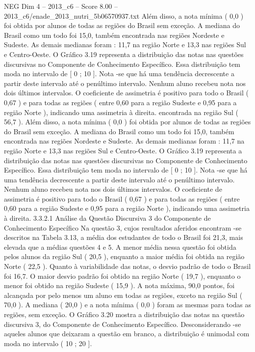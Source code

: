 \begin{textsample}{NEG Dim 4 – 2013\_c6 – Score 8.00 – 2013\_c6/enade\_2013\_nutri\_5b06570937.txt}
Além disso, a nota mínima ( 0,0 ) foi obtida por alunos de todas as regiões do Brasil sem exceção.
A mediana do Brasil como um todo foi 15,0, também encontrada nas regiões Nordeste e Sudeste.
As demais medianas foram : 11,7 na região Norte e 13,3 nas regiões Sul e Centro-Oeste.
O Gráfico 3.19 representa a distribuição das notas nas questões discursivas no Componente de Conhecimento Específico.
Essa distribuição tem moda no intervalo de [ 0 ; 10 ].
Nota -se que há uma tendência decrescente a partir deste intervalo até o penúltimo intervalo.
Nenhum aluno recebeu nota nos dois últimos intervalos.
O coeficiente de assimetria é positivo para todo o Brasil ( 0,67 ) e para todas as regiões ( entre 0,60 para a região Sudeste e 0,95 para a região Norte ), indicando uma assimetria à direita. encontrada na região Sul ( 56,7 ).
Além disso, a nota mínima ( 0,0 ) foi obtida por alunos de todas as regiões do Brasil sem exceção.
A mediana do Brasil como um todo foi 15,0, também encontrada nas regiões Nordeste e Sudeste.
As demais medianas foram : 11,7 na região Norte e 13,3 nas regiões Sul e Centro-Oeste.
O Gráfico 3.19 representa a distribuição das notas nas questões discursivas no Componente de Conhecimento Específico.
Essa distribuição tem moda no intervalo de [ 0 ; 10 ].
Nota -se que há uma tendência decrescente a partir deste intervalo até o penúltimo intervalo.
Nenhum aluno recebeu nota nos dois últimos intervalos.
O coeficiente de assimetria é positivo para todo o Brasil ( 0,67 ) e para todas as regiões ( entre 0,60 para a região Sudeste e 0,95 para a região Norte ), indicando uma assimetria à direita. 3.3.2.1 Análise da Questão Discursiva 3 do Componente de Conhecimento Específico Na questão 3, cujos resultados aferidos encontram -se descritos na Tabela 3.13, a média dos estudantes de todo o Brasil foi 21,3, mais elevada que a médias questões 4 e 5.
A menor média nessa questão foi obtida pelos alunos da região Sul ( 20,5 ), enquanto a maior média foi obtida na região Norte ( 22,5 ).
Quanto à variabilidade das notas, o desvio padrão de todo o Brasil foi 16,7.
O maior desvio padrão foi obtido na região Norte ( 19,7 ), enquanto o menor foi obtido na região Sudeste ( 15,9 ).
A nota máxima, 90,0 pontos, foi alcançada por pelo menos um aluno em todas as regiões, exceto na região Sul ( 70,0 ).
A mediana ( 20,0 ) e a nota mínima ( 0,0 ) foram as mesmas para todas as regiões, sem exceção.
O Gráfico 3.20 mostra a distribuição das notas na questão discursiva 3, do Componente de Conhecimento Específico.
Desconsiderando -se aqueles alunos que deixaram a questão em branco, a distribuição é unimodal com moda no intervalo ( 10 ; 20 ].

\end{textsample}
